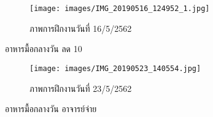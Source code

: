 
\begin{figure}
    \centering
    \texttt{[image: images/IMG\_20190516\_124952\_1.jpg]}
    \caption{ภาพการฝึกงานวันที่ 16/5/2562}
\end{figure}

อาหารมื้อกลางวัน ลด 10%

\begin{figure}
    \centering
    \texttt{[image: images/IMG\_20190523\_140554.jpg]}
    \caption{ภาพการฝึกงานวันที่ 23/5/2562}
\end{figure}

อาหารมื้อกลางวัน อาจารย์จ่าย

